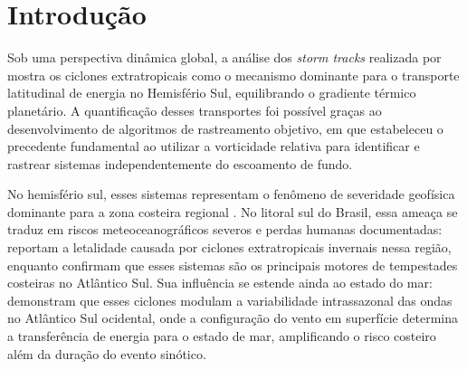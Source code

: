 \chapter{Introdução} \label{ch:introduccion}


Sob uma perspectiva dinâmica global, a análise dos \emph{storm tracks} realizada por \citet{hoskins2005new} mostra os ciclones extratropicais como o mecanismo dominante para o transporte latitudinal de energia no Hemisfério Sul, equilibrando o gradiente térmico planetário. A quantificação desses transportes foi possível graças ao desenvolvimento de algoritmos de rastreamento objetivo, em que \citet{sinclair1994objective} estabeleceu o precedente fundamental ao utilizar a vorticidade relativa para identificar e rastrear sistemas independentemente do escoamento de fundo.

No hemisfério sul, esses sistemas representam o fenômeno de severidade geofísica dominante para a zona costeira regional \citep{gramcianinov2023impact}. No litoral sul do Brasil, essa ameaça se traduz em riscos meteoceanográficos severos e perdas humanas documentadas: \citet{bartolomei2024extremos} reportam a letalidade causada por ciclones extratropicais invernais nessa região, enquanto \citet{miranda2026patterns} confirmam que esses sistemas são os principais motores de tempestades costeiras no Atlântico Sul. Sua influência se estende ainda ao estado do mar: \citet{sasaki2021intraseasonal} demonstram que esses ciclones modulam a variabilidade intrassazonal das ondas no Atlântico Sul ocidental, onde a configuração do vento em superfície determina a transferência de energia para o estado de mar, amplificando o risco costeiro além da duração do evento sinótico.


